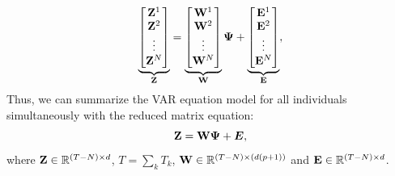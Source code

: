 \begin{equation}\label{eq:multiresponse_regression}
	\underbrace{\begin{bmatrix}  \mathbf{Z}^1 \\ \mathbf{Z}^2  \\ \vdots \\ \mathbf{Z}^N \end{bmatrix}}_{\mathbf{Z}} = 
	\underbrace{\begin{bmatrix}  \mathbf{W}^1 \\ \mathbf{W}^2  \\ \vdots \\ \mathbf{W}^N \end{bmatrix}}_{\mathbf{W}}  
	\bm{\Psi} + 
	\underbrace{\begin{bmatrix}  \mathbf{E}^1 \\ \mathbf{E}^2 \\ \vdots \\ \mathbf{E}^N \end{bmatrix}}_{\mathbf{E}} ,
\end{equation}
Thus, we can summarize the VAR equation model for all individuals simultaneously with the reduced matrix equation:
\begin{equation}\label{eq:rvar_mat}
	\mathbf{Z} = \mathbf{W} \bm{\Psi} + \bm{E},
\end{equation}
where $\mathbf{Z} \in \mathbb{R}^{(T - N)\times d}$, $T = \sum_{k} T_k$, $\mathbf{W}\in \mathbb{R}^{(T - N)\times (d(p + 1))}$ and $\mathbf{E} \in \mathbb{R}^{(T - N)\times d}$. 

